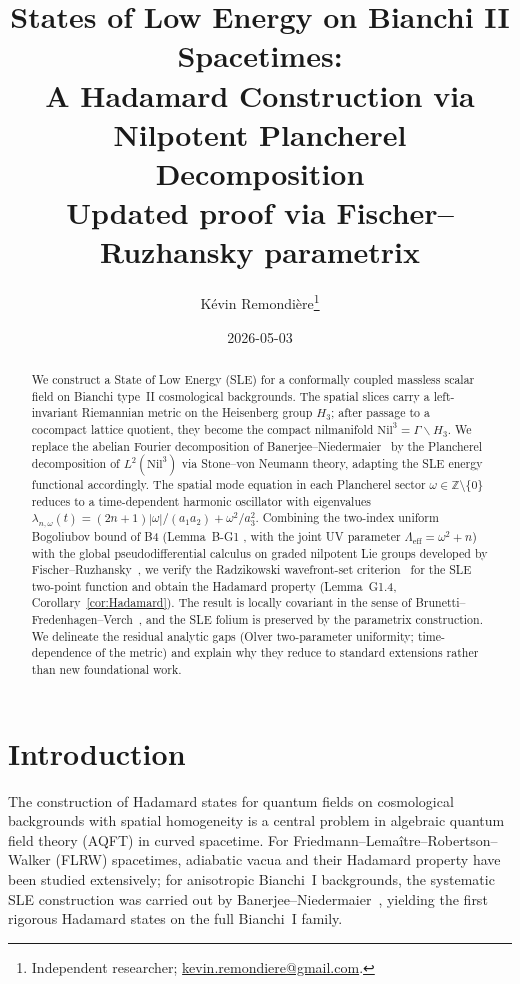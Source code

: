 \documentclass[11pt, a4paper]{article}
\title{States of Low Energy on Bianchi II Spacetimes:\\
A Hadamard Construction via Nilpotent Plancherel Decomposition\\[6pt]
{\large Updated proof via Fischer--Ruzhansky parametrix}}
\author{K\'evin Remondi\`ere\thanks{Independent researcher; \href{mailto:kevin.remondiere@gmail.com}{kevin.remondiere@gmail.com}.}}
\date{2026-05-03}
\newcommand{\ZZ}{\mathbb{Z}}
\newcommand{\Hgroup}{H_3}
\newcommand{\Nil}{\mathrm{Nil}^3}
\newcommand{\lam}{\lambda}
\newcommand{\om}{\omega}
\newcommand{\Lam}{\Lambda}
\begin{document}
\maketitle

\begin{abstract}
We construct a State of Low Energy (SLE) for a conformally
coupled massless scalar field on Bianchi type~II cosmological backgrounds.
The spatial slices carry a left-invariant Riemannian metric on the Heisenberg group
$\Hgroup$; after passage to a cocompact lattice quotient, they become the
compact nilmanifold $\Nil = \Gamma \backslash \Hgroup$.
We replace the abelian Fourier decomposition of Banerjee--Niedermaier~\cite{BN23}
by the Plancherel decomposition of $L^2(\Nil)$ via Stone--von Neumann theory,
adapting the SLE energy functional accordingly.
The spatial mode equation in each Plancherel sector $\om \in \ZZ\setminus\{0\}$
reduces to a time-dependent harmonic oscillator with eigenvalues
$\lam_{n,\om}(t) = (2n+1)|\om|/(a_1 a_2) + \om^2/a_3^2$.
Combining the two-index uniform Bogoliubov bound of B4 (Lemma~B-G1
\cite{LemmaBG1}, with the joint UV parameter
$\Lam_{\mathrm{eff}}=\om^2+n$) with the global pseudodifferential calculus on
graded nilpotent Lie groups developed by Fischer--Ruzhansky~\cite{FR16},
we verify the Radzikowski wavefront-set criterion~\cite{Rad96} for the SLE
two-point function and obtain the Hadamard property
(Lemma~G1.4, Corollary~\ref{cor:Hadamard}). The result is locally covariant
in the sense of Brunetti--Fredenhagen--Verch~\cite{BFV03}, and the SLE
folium is preserved by the parametrix construction. We delineate the residual
analytic gaps (Olver two-parameter uniformity; time-dependence of the metric)
and explain why they reduce to standard extensions rather than new foundational
work.
\end{abstract}

\tableofcontents

\section{Introduction}

The construction of Hadamard states for quantum fields on cosmological backgrounds
with spatial homogeneity is a central problem in algebraic quantum field theory (AQFT)
in curved spacetime.
For Friedmann--Lemaître--Robertson--Walker (FLRW) spacetimes, adiabatic vacua and
their Hadamard property have been studied extensively;
for anisotropic Bianchi~I backgrounds, the systematic SLE construction was carried out
by Banerjee--Niedermaier~\cite{BN23}, yielding the first rigorous Hadamard states
on the full Bianchi~I family.
\end{document}
